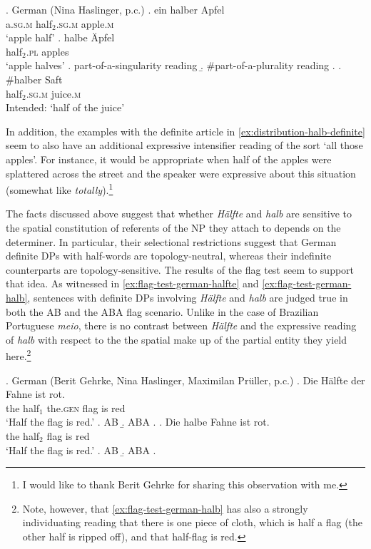 \ex. German (Nina Haslinger, p.c.)\label{ex:distribution-halb}
\ag. ein halber Apfel\label{ex:distribution-halb-sg}\\
a\textsc{.sg.m}  half$_{2}$\textsc{.sg.m} apple\textsc{.m}\\
`apple half'
\bg. halbe Äpfel\label{ex:distribution-halb-pl}\\
half$_{2}$\textsc{.pl}  apples\\
`apple halves'
\a. part-of-a-singularity reading
\b. \#part-of-a-plurality reading
\z.
\bg. \#halber Saft\label{ex:distribution-halb-mass}\\
half$_{2}$\textsc{.sg.m} juice\textsc{.m} \\
Intended: `half of the juice'

In addition, the examples with the definite article in \ref{ex:distribution-halb-definite} seem to also have an additional expressive intensifier reading of the sort `all those apples'. For instance, it would be appropriate when half of the apples were splattered across the street and the speaker were expressive about this situation (somewhat like \textit{totally}).\footnote{I would like to thank Berit Gehrke for sharing this observation with me.}\largerpage

The facts discussed above suggest that whether \textit{Hälfte} and \textit{halb} are sensitive to the spatial constitution of referents of the NP they attach to depends on the determiner. In particular, their selectional restrictions suggest that German definite DPs with half-words are topology-neutral, whereas their indefinite counterparts are topology-sensitive. The results of the flag test seem to support that idea. As witnessed in \ref{ex:flag-test-german-halfte} and \ref{ex:flag-test-german-halb}, sentences with definite DPs involving \textit{Hälfte} and \textit{halb} are judged true in both the AB and the ABA flag scenario. Unlike in the case of Brazilian Portuguese \textit{meio}, there is no contrast between \textit{Hälfte} and the expressive reading of \textit{halb} with respect to the the spatial make up of the partial entity they yield here.\footnote{Note, however, that \ref{ex:flag-test-german-halb} has also a strongly individuating reading that there is one piece of cloth, which is half a flag (the other half is ripped off), and that half-flag is red.}

\ex. German (Berit Gehrke, Nina Haslinger, Maximilan Prüller, p.c.)\label{ex:flag-test-german}
\ag. Die Hälfte der Fahne ist rot.\label{ex:flag-test-german-halfte}\\
		the half$_1$ the\textsc{.gen} flag is red\\
		`Half the flag is red.'
		\a. AB
		\b. ABA
		\z.
		\bg. Die halbe Fahne ist rot.\label{ex:flag-test-german-halb}\\
		the half$_2$ flag is red\\
		`Half the flag is red.'
		\a. AB
		\b. ABA
		\z.

